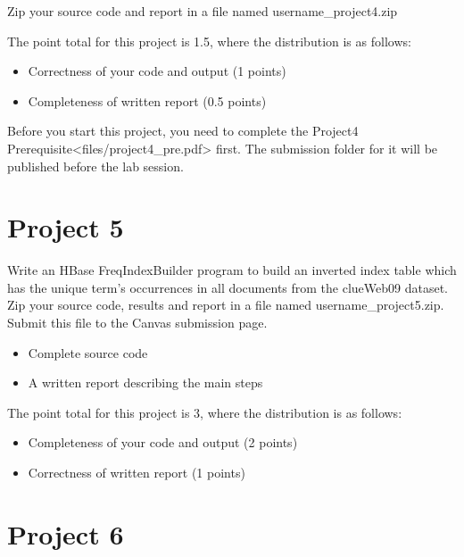 Zip your source code and report in a file named username\_project4.zip

The point total for this project is 1.5, where the distribution is as
follows:

\begin{itemize}
\tightlist
\item
  Correctness of your code and output (1 points)
\item
  Completeness of written report (0.5 points)
\end{itemize}

Before you start this project, you need to complete the
Project4 Prerequisite\textless{}files/project4\_pre.pdf\textgreater{}
first. The submission folder for it will be published before the lab
session.




\chapter{Project 5}\label{project-5}

Write an HBase FreqIndexBuilder program to build an inverted index table
which has the unique term's occurrences in all documents from the
clueWeb09 dataset. Zip your source code, results and report in a file
named username\_project5.zip. Submit this file to the Canvas submission
page.

\begin{itemize}
\tightlist
\item
  Complete source code
\item
  A written report describing the main steps
\end{itemize}

The point total for this project is 3, where the distribution is as
follows:

\begin{itemize}
\tightlist
\item
  Completeness of your code and output (2 points)
\item
  Correctness of written report (1 points)
\end{itemize}



\chapter{Project 6}\label{project-6}

